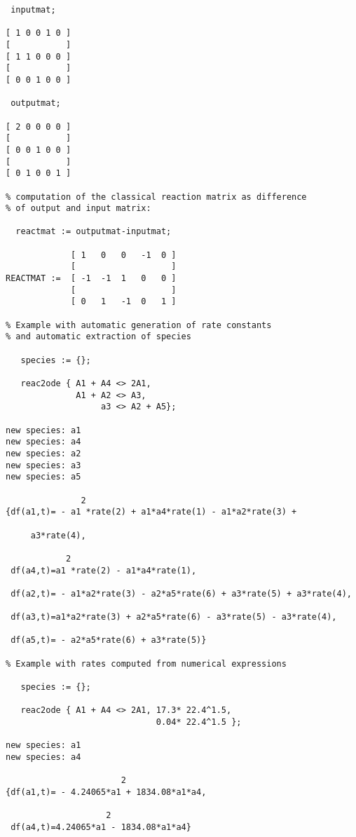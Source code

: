 \begin{verbatim}
 inputmat;

[ 1 0 0 1 0 ]
[           ]
[ 1 1 0 0 0 ]
[           ]
[ 0 0 1 0 0 ]

 outputmat;

[ 2 0 0 0 0 ]
[           ] 
[ 0 0 1 0 0 ] 
[           ] 
[ 0 1 0 0 1 ] 

% computation of the classical reaction matrix as difference
% of output and input matrix:

  reactmat := outputmat-inputmat;

             [ 1   0   0   -1  0 ]
             [                   ] 
REACTMAT :=  [ -1  -1  1   0   0 ] 
             [                   ] 
             [ 0   1   -1  0   1 ]

% Example with automatic generation of rate constants
% and automatic extraction of species

   species := {};

   reac2ode { A1 + A4 <> 2A1, 
              A1 + A2 <> A3,
                   a3 <> A2 + A5};

new species: a1
new species: a4
new species: a2
new species: a3
new species: a5

               2
{df(a1,t)= - a1 *rate(2) + a1*a4*rate(1) - a1*a2*rate(3) + 

     a3*rate(4),

            2
 df(a4,t)=a1 *rate(2) - a1*a4*rate(1),

 df(a2,t)= - a1*a2*rate(3) - a2*a5*rate(6) + a3*rate(5) + a3*rate(4),

 df(a3,t)=a1*a2*rate(3) + a2*a5*rate(6) - a3*rate(5) - a3*rate(4),

 df(a5,t)= - a2*a5*rate(6) + a3*rate(5)}

% Example with rates computed from numerical expressions

   species := {};

   reac2ode { A1 + A4 <> 2A1, 17.3* 22.4^1.5,
                              0.04* 22.4^1.5 };

new species: a1
new species: a4

                       2
{df(a1,t)= - 4.24065*a1 + 1834.08*a1*a4,

                    2
 df(a4,t)=4.24065*a1 - 1834.08*a1*a4}
\end{verbatim}